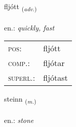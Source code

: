 \documentclass[frontgrid, backgrid]{flacards}\usepackage[]{graphicx}\usepackage[]{xcolor}
\begin{document}
\renewcommand{\flhead}{\vskip5pt \fboxsep=0pt {\small\bfseries\footnotesize Atviksorð | Adverb}}
\renewcommand{\fcfoot}{\vskip5pt \fboxsep=0pt \hspace{2pt}{\small\bfseries\footnotesize 2K}}

\renewcommand{\blhead}{\vskip5pt {\small\bfseries\footnotesize Atviksorð | Adverb }}
\renewcommand{\bcfoot}{\vskip5pt \hspace{2pt}{\small\bfseries\footnotesize 2K}}


{fljótt \small{\textsubscript{(\textit{adv.})}} \\[1ex] %
\textphonetic{[fljouht]} \\
en.: \emph{quickly, fast} \\  [2ex]
\renewcommand*{\arraystretch}{0.8}
\begin{tabular}{ll}
\textsc{pos}: & fljótt \\ 
\textsc{comp.}: & fljótar \\ 
\textsc{superl.}: & fljótast \\
\end{tabular}
}

\renewcommand{\flhead}{\vskip5pt \fboxsep=0pt {\small\bfseries\footnotesize Nafnorð | Noun}}
\renewcommand{\fcfoot}{\vskip5pt \fboxsep=0pt \hspace{2pt}{\small\bfseries\footnotesize 2K}}

\renewcommand{\blhead}{\vskip5pt {\small\bfseries\footnotesize Nafnorð | Noun }}
\renewcommand{\bcfoot}{\vskip5pt \hspace{2pt}{\small\bfseries\footnotesize 2K}}


{steinn \small{\textsubscript{(\textit{m.})}} \\[1ex] %
\textphonetic{[steitn̥]} \\
en.: \emph{stone} \\  [2ex]
\renewcommand*{\arraystretch}{0.8}
}
\end{document}
